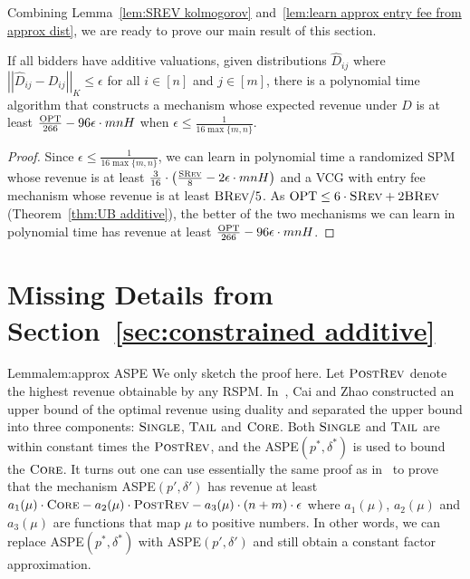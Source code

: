 Combining Lemma~\ref{lem:SREV kolmogorov} and~\ref{lem:learn approx entry fee from approx dist}, we are ready to prove our main result of this section.
\begin{theorem}\label{thm:additive Kolmogorov}
If all bidders have additive valuations, given distributions $\hat{D}_{ij}$ where $\left|\left|\hat{D}_{ij}-D_{ij}\right|\right|_K\leq \epsilon$ for all $i\in[n]$ and $j\in[m]$, there is a polynomial time algorithm that constructs a mechanism whose expected revenue under $D$ is at least $\frac{\text{OPT}}{266}-96\epsilon\cdot mnH$ when $\epsilon\leq \frac{1}{16\max\{m,n\}}$.\end{theorem}
\begin{proof}
	Since $\epsilon\leq \frac{1}{16\max\{m,n\}}$, we can learn in polynomial time a randomized SPM whose revenue is at least $\frac{3}{16}\cdot\left(\frac{\textsc{SRev}}{8}-2\epsilon\cdot mnH\right)$ and a VCG with entry fee mechanism whose revenue is at least $\textsc{BRev}/5$. As $\text{OPT}\leq 6\cdot \textsc{SRev}+2\textsc{BRev}$ (Theorem~\ref{thm:UB additive}), the better of the two mechanisms we can learn in polynomial time has revenue at least $\frac{\text{OPT}}{266}-96\epsilon\cdot mnH$.
\end{proof}

\section{Missing Details from Section~\ref{sec:constrained additive}}\label{sec:appx XOS}

\begin{prevproof}{Lemma}{lem:approx ASPE}
We only sketch the proof here. Let $\textsc{PostRev}$ denote the highest revenue obtainable by any RSPM. In~\cite{CaiZ17}, Cai and Zhao constructed an upper bound of the optimal revenue using duality and separated the upper bound into three components: $\textsc{Single}$, $\textsc{Tail}$ and $\textsc{Core}$. Both $\textsc{Single}$ and $\textsc{Tail}$ are within constant times the $\textsc{PostRev}$, and the ASPE$(p^*,\delta^*)$ is used to bound the $\textsc{Core}$. It turns out one can use essentially the same proof as in~\cite{CaiZ17} to prove that the mechanism ASPE$(p',\delta')$ has revenue at least $a_1(\mu)\cdot \textsc{Core}-a_2(\mu)\cdot\textsc{PostRev}-a_3(\mu)\cdot (n+m)\cdot \epsilon$ where  $a_1(\mu)$, $a_2(\mu)$ and $a_3(\mu)$ are functions that map $\mu$ to positive numbers. In other words, we can replace ASPE$(p^*,\delta^*)$ with ASPE$(p',\delta')$ and still obtain a constant factor approximation.
\end{prevproof}

